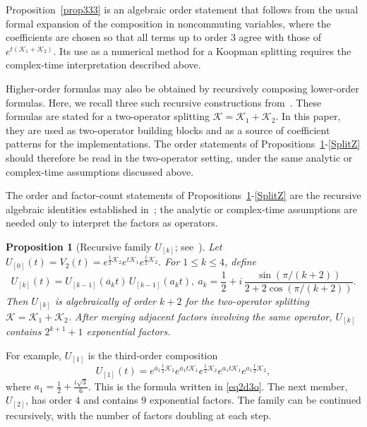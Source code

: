 \documentclass[preprint,1p,times,nopreprintline]{elsarticle}
\newtheorem{proposition}[theorem]{Proposition}
\begin{document}
Proposition~\ref{prop333} is an algebraic order statement that follows from the usual formal expansion of the composition in noncommuting variables, where the coefficients are chosen so that all terms up to order $3$ agree with those of $e^{t(\mathcal{K}_1+\mathcal{K}_2)}$. Its use as a numerical method for a Koopman splitting requires the complex-time interpretation described above.

Higher-order formulas may also be obtained by recursively composing lower-order formulas. Here, we recall three such recursive constructions from~\citet{JD6}. These formulas are stated for a two-operator splitting $\mathcal{K}=\mathcal{K}_1+\mathcal{K}_2$. In this paper, they are used as two-operator building blocks and as a source of coefficient patterns for the implementations. The order statements of Propositions~\ref{splitU}-\ref{SplitZ} should therefore be read in the two-operator setting, under the same analytic or complex-time assumptions discussed above.

The order and factor-count statements of Propositions~\ref{splitU}-\ref{SplitZ} are the recursive algebraic identities established in~\citet{JD6}; the analytic or complex-time assumptions are needed only to interpret the factors as operators.

\begin{proposition}[Recursive family $U_{[k]}$; see~\citet{JD6}]
\label{splitU}
Let
$U_{[0]}(t)
=
V_2(t)
=
e^{\frac{t}{2}\mathcal{K}_2}
e^{t\mathcal{K}_1}
e^{\frac{t}{2}\mathcal{K}_2}.
$
For $1\le k\le 4$, define
\begin{equation}
\label{H53}
U_{[k]}(t)
=
U_{[k-1]}(\overline{a}_k t)\,
U_{[k-1]}(a_k t),
~
a_k
=
\frac{1}{2}
+
i\,
\frac{\sin(\pi/(k+2))}
{2+2\cos(\pi/(k+2))}.
\end{equation}
Then $U_{[k]}$ is algebraically of order $k+2$ for the two-operator splitting
$\mathcal{K}=\mathcal{K}_1+\mathcal{K}_2$. After merging adjacent factors involving the same operator, $U_{[k]}$ contains $2^{k+1}+1$ exponential factors.
\end{proposition}

For example, $U_{[1]}$ is the third-order composition
\[
U_{[1]}(t)
=
e^{\overline{a}_1\frac{t}{2}\mathcal{K}_2}
e^{\overline{a}_1 t\mathcal{K}_1}
e^{\frac{t}{2}\mathcal{K}_2}
e^{a_1 t\mathcal{K}_1}
e^{a_1\frac{t}{2}\mathcal{K}_2},
\]
where $a_1=\frac{1}{2}+\frac{i\sqrt{3}}{6}$. This is the formula written in \eqref{eq2d3o}. The next member, $U_{[2]}$, has order $4$ and contains $9$ exponential factors. The family can be continued recursively, with the number of factors doubling at each step.
\end{document}
